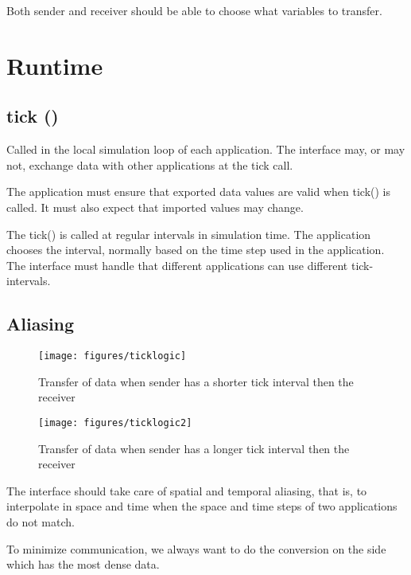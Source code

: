 \documentclass[a4paper]{report}
\begin{document}
Both sender and receiver should be able to choose what variables to
transfer.


\section{Runtime}

\subsection{tick ()}

Called in the local simulation loop of each application.
The interface may, or may not, exchange data with other applications
at the tick call.

The application must ensure that exported data values are valid when
tick() is called.  It must also expect that imported values may change.

The tick() is called at regular intervals in simulation time.
The application chooses the interval, normally based on the time step
used in the application.  The interface must handle that different
applications can use different tick-intervals.


\subsection{Aliasing}

\begin{figure}
  \begin{center}
    \begin{minipage}{0.45\textwidth}
      \texttt{[image: figures/ticklogic]}
      \caption{Transfer of data when sender has a shorter
        tick interval then the receiver}
    \end{minipage}
    \hfill
    \begin{minipage}{0.45\textwidth}
      \texttt{[image: figures/ticklogic2]}
      \caption{Transfer of data when sender has a longer
        tick interval then the receiver}
    \end{minipage}
  \end{center}
\end{figure}

The interface should take care of spatial and temporal aliasing, that
is, to interpolate in space and time when the space and time steps of
two applications do not match.

To minimize communication, we always want to do the conversion on the
side which has the most dense data.
\end{document}
